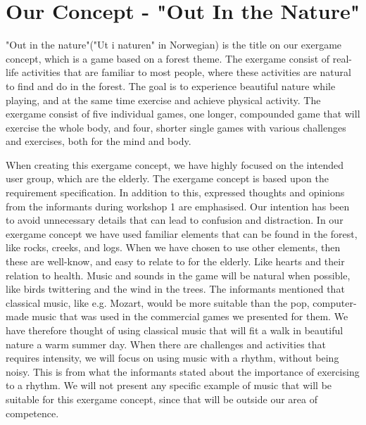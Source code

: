 \section{Our Concept - "Out In the Nature"}
\label{sec:outinthenature}

"Out in the nature"("Ut i naturen" in Norwegian) is the title on our exergame concept, which is a game based on a forest theme. The exergame consist of real-life activities that are familiar to most people, where these activities are natural to find and do in the forest. The goal is to experience beautiful nature while playing, and at the same time exercise and achieve physical activity. The exergame consist of five individual games, one longer, compounded game that will exercise the whole body, and four, shorter single games with various challenges and exercises, both for the mind and body. 

When creating this exergame concept, we have highly focused on the intended user group, which are the elderly. The exergame concept is based upon the requirement specification. In addition to this, expressed thoughts and opinions from the informants during workshop 1 are emphasised. Our intention has been to avoid unnecessary details that can lead to confusion and distraction. In our exergame concept we have used familiar elements that can be found in the forest, like rocks, creeks, and logs. When we have chosen to use other elements, then these are well-know, and easy to relate to for the elderly. Like hearts and their relation to health. Music and sounds in the game will be natural when possible, like birds twittering and the wind in the trees. The informants mentioned that classical music, like e.g. Mozart, would be more suitable than the pop, computer-made music that was used in the commercial games we presented for them. We have therefore thought of using classical music that will fit a walk in beautiful nature a warm summer day. When there are challenges and activities that requires intensity, we will focus on using music with a rhythm, without being noisy. This is from what the informants stated about the importance of exercising to a rhythm. We will not present any specific example of music that will be suitable for this exergame concept, since that will be outside our area of competence.           

